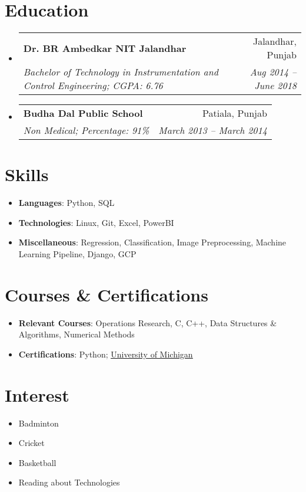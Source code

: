 \documentclass[letterpaper,11pt]{article}
\makeatletter
\newcommand{\resumeSubheading}[4]{
  \vspace{-1pt}\item
    \begin{tabular*}{0.97\textwidth}[t]{l@{\extracolsep{\fill}}r}
      \textbf{#1} & #2 \\
      \textit{\small#3} & \textit{\small #4} \\
    \end{tabular*}\vspace{-5pt}
}
\newcommand{\resumeSubHeadingListStart}{\begin{itemize}[leftmargin=*]}
\newcommand{\resumeSubHeadingListEnd}{\end{itemize}}
\makeatother
\begin{document}
\section{Education}
  \resumeSubHeadingListStart
    \resumeSubheading
      {Dr. BR Ambedkar NIT Jalandhar}{Jalandhar, Punjab}
      {Bachelor of Technology in Instrumentation and Control Engineering;  CGPA: 6.76}{Aug 2014 -- June 2018}
    \resumeSubheading
      {Budha Dal Public School}{Patiala, Punjab}
      {Non Medical; Percentage: 91\%}{March 2013 -- March 2014}
  \resumeSubHeadingListEnd

%
\section{Skills}
  \resumeSubHeadingListStart
    \item{
      \textbf{Languages}{: Python, SQL}
      \hfill
    }
    \item{
      \textbf{Technologies}{: Linux, Git, Excel, PowerBI}
      \hfill
    }
    \item{
      \textbf{Miscellaneous}{: Regression, Classification, Image Preprocessing, Machine Learning Pipeline, Django, GCP}
      \hfill
    }
  \resumeSubHeadingListEnd

\section{Courses \& Certifications}
  \resumeSubHeadingListStart
    \item{
      \textbf{Relevant Courses}{: Operations Research, C, C++, Data Structures \& Algorithms, Numerical Methods}
      \hfill
    }
    \item{
      \textbf{Certifications}{: Python}; \underline{\href{https://www.coursera.org/account/accomplishments/certificate/BGRL6KFPRFAL}{University of Michigan}}
      \hfill
    }
  \resumeSubHeadingListEnd

\section{Interest}
  \resumeSubHeadingListStart
    \item{
      {Badminton}
      \hfill
    }
    \item{
      {Cricket}
      \hfill
    }
    \item{
      {Basketball}
      \hfill
    }
    \item{
      {Reading about Technologies}
      \hfill
    }
  \resumeSubHeadingListEnd


\end{document}
